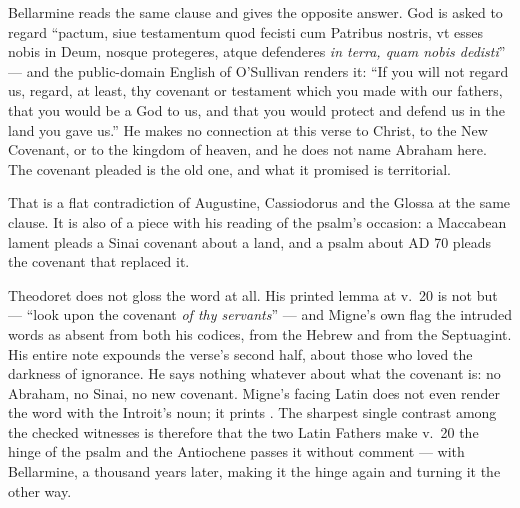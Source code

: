 \begin{witnessnote}
Bellarmine reads the same clause and gives the opposite answer. God is asked to
regard ``pactum, siue testamentum quod fecisti cum Patribus nostris, vt esses
nobis in Deum, nosque protegeres, atque defenderes \emph{in terra, quam nobis
dedisti}'' --- and the public-domain English of O'Sullivan renders it: ``If you
will not regard us, regard, at least, thy covenant or testament which you made
with our fathers, that you would be a God to us, and that you would protect and
defend us in the land you gave us.'' He makes no connection at this verse to
Christ, to the New Covenant, or to the kingdom of heaven, and he does not name
Abraham here. The covenant pleaded is the old one, and what it promised is
territorial.

That is a flat contradiction of Augustine, Cassiodorus and the Glossa at the
same clause. It is also of a piece with his
reading of the psalm's occasion: a Maccabean lament pleads a Sinai covenant
about a land, and a psalm about AD 70 pleads the covenant that replaced it.
\end{witnessnote}

\begin{witnessnote}
Theodoret does not gloss the word at all. His printed lemma at v.~20 is not
 but  --- ``look upon the covenant \emph{of thy servants}''
--- and Migne's own  flag the intruded words as absent
from both his codices, from the Hebrew and from the Septuagint. His entire note
expounds the verse's second half, about those who loved the darkness of
ignorance. He says nothing whatever about what the covenant is: no Abraham, no
Sinai, no new covenant. Migne's facing Latin does not even render the word with
the Introit's noun; it prints . The sharpest single contrast among
the checked witnesses is therefore that the two Latin Fathers make v.~20 the hinge of
the psalm and the Antiochene passes it without comment --- with Bellarmine, a
thousand years later, making it the hinge again and turning it the other way.
\end{witnessnote}


